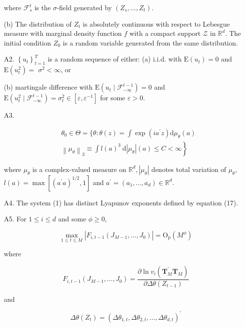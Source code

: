 \documentclass[12pt]{article}
\begin{document}
where $\mathscr{F}_{s}^{t}$ is the $\sigma$-field generated by $\left(Z_{s}, \ldots, Z_{t}\right)$.

(b) The distribution of $Z_{t}$ is absolutely continuous with respect to Lebesgue measure with marginal density function $f$ with a compact support $\mathscr{Z}$ in $\mathbb{R}^{d}$. The initial condition $Z_{0}$ is a random variable generated from the same distribution.

A2. $\left\{u_{t}\right\}_{t=1}^{T}$ is a random sequence of either: (a) i.i.d. with $\mathrm{E}\left(u_{t}\right)=0$ and $\mathrm{E}\left(u_{t}^{2}\right)=$ $\sigma^{2}<\infty$, or

(b) martingale difference with $\mathrm{E}\left(u_{t} \mid \mathscr{F}_{-\infty}^{t-1}\right)=0$ and $\mathrm{E}\left(u_{t}^{2} \mid \mathscr{F}_{-\infty}^{t-1}\right)=\sigma_{t}^{2} \in\left[\varepsilon, \varepsilon^{-1}\right]$ for some $\varepsilon>0$.

A3.

$$
\begin{aligned}
& \theta_{0} \in \Theta=\{\theta: \theta(z)=\int \exp \left(i a^{\prime} z\right) \mathrm{d} \mu_{\theta}(a) \\
&\left.\left\|\mu_{\theta}\right\|_{3} \equiv \int l(a)^{3} \mathrm{~d}\left|\mu_{\theta}\right|(a) \leqslant C<\infty\right\}
\end{aligned}
$$

where $\mu_{\theta}$ is a complex-valued measure on $\mathbb{R}^{d},\left|\mu_{\theta}\right|$ denotes total variation of $\mu_{\theta}$, $l(a)=\max \left[\left(a^{\prime} a\right)^{1 / 2}, 1\right]$ and $a^{\prime}=\left(a_{1}, \ldots, a_{d}\right) \in \mathbb{R}^{d}$.



A4. The system (1) has distinct Lyapunov exponents defined by equation (17).

A5. For $1 \leqslant i \leqslant d$ and some $\phi \geqslant 0$,

$$
\max _{1 \leqslant t \leqslant M}\left|F_{i, t-1}\left(J_{M-1}, \ldots, J_{0}\right)\right|=\mathrm{O}_{\mathrm{p}}\left(M^{\phi}\right)
$$

where

$$
F_{i, t-1}\left(J_{M-1}, \ldots, J_{0}\right)=\frac{\partial \ln v_{i}\left(\mathbf{T}_{M}^{\prime} \mathbf{T}_{M}\right)}{\partial \Delta \theta\left(Z_{t-1}\right)}
$$

and

$$
\Delta \theta\left(Z_{t}\right)=\left(\Delta \theta_{1, t}, \Delta \theta_{2, t}, \ldots, \Delta \theta_{d, t}\right)^{\prime}
$$
\end{document}

